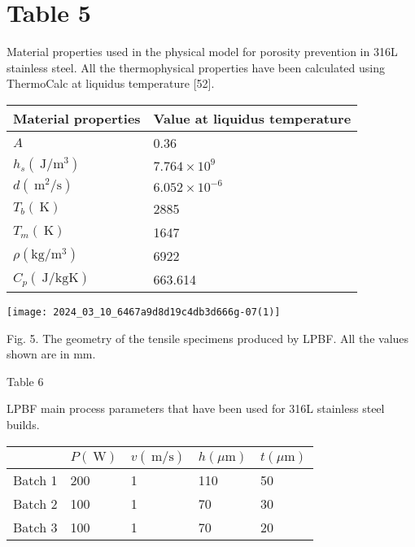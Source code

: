 \documentclass[10pt]{article}
\begin{document}
\section*{Table 5}
Material properties used in the physical model for porosity prevention in 316L stainless steel. All the thermophysical properties have been calculated using ThermoCalc at liquidus temperature [52].

\begin{center}
\begin{tabular}{ll}
\hline
Material properties & Value at liquidus temperature \\
\hline
$A$ & 0.36 \\
$h_{s}\left(\mathrm{~J} / \mathrm{m}^{3}\right)$ & $7.764 \times 10^{9}$ \\
$d\left(\mathrm{~m}^{2} / \mathrm{s}\right)$ & $6.052 \times 10^{-6}$ \\
$T_{b}(\mathrm{~K})$ & 2885 \\
$T_{m}(\mathrm{~K})$ & 1647 \\
$\rho\left(\mathrm{kg} / \mathrm{m}^{3}\right)$ & 6922 \\
$C_{p}(\mathrm{~J} / \mathrm{kg} \mathrm{K})$ & 663.614 \\
\hline
\end{tabular}
\end{center}

\begin{center}
\texttt{[image: 2024\_03\_10\_6467a9d8d19c4db3d666g-07(1)]}
\end{center}

Fig. 5. The geometry of the tensile specimens produced by LPBF. All the values shown are in $\mathrm{mm}$.

Table 6

LPBF main process parameters that have been used for 316L stainless steel builds.

\begin{center}
\begin{tabular}{lllll}
\hline
 & $P(\mathrm{~W})$ & $v(\mathrm{~m} / \mathrm{s})$ & $h(\mu \mathrm{m})$ & $t(\mu \mathrm{m})$ \\
\hline
Batch 1 & 200 & 1 & 110 & 50 \\
Batch 2 & 100 & 1 & 70 & 30 \\
Batch 3 & 100 & 1 & 70 & 20 \\
\hline
\end{tabular}
\end{center}
\end{document}
